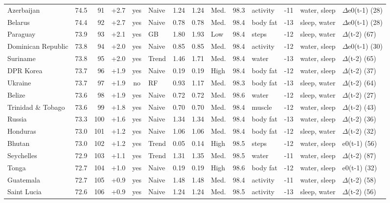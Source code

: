 {\begin{longtable}{l r r r c l r r l r l r l l}
Azerbaijan & 74.5 & 91 & +2.7 & yes & Naive & 1.24 & 1.24 & Med. & 98.3 & activity & -11 & water, sleep & $\Delta$e0(t-1) (28) \\
Belarus & 74.4 & 92 & +2.7 & yes & Naive & 0.78 & 0.78 & Med. & 98.4 & body fat & -13 & sleep, water & $\Delta$e0(t-1) (28) \\
Paraguay & 73.9 & 93 & +2.1 & yes & GB & 1.80 & 1.93 & Low & 98.4 & steps & -12 & sleep, water & $\Delta$(t-2) (67) \\
Dominican Republic & 73.8 & 94 & +2.0 & yes & Naive & 0.85 & 0.85 & Med. & 98.4 & activity & -12 & water, sleep & $\Delta$e0(t-1) (30) \\
Suriname & 73.8 & 95 & +2.0 & yes & Trend & 1.46 & 1.71 & Med. & 98.4 & water & -13 & water, sleep & $\Delta$(t-2) (65) \\
DPR Korea & 73.7 & 96 & +1.9 & yes & Naive & 0.19 & 0.19 & High & 98.4 & body fat & -12 & water, sleep & $\Delta$(t-2) (37) \\
Ukraine & 73.7 & 97 & +1.9 & no & RF & 0.93 & 1.17 & Med. & 98.3 & body fat & -13 & sleep, water & $\Delta$(t-2) (64) \\
Belize & 73.6 & 98 & +1.9 & yes & Naive & 0.72 & 0.72 & Med. & 98.6 & water & -12 & sleep, water & $\Delta$(t-2) (27) \\
Trinidad \& Tobago & 73.6 & 99 & +1.8 & yes & Naive & 0.70 & 0.70 & Med. & 98.4 & muscle & -12 & water, sleep & $\Delta$(t-2) (43) \\
Russia & 73.3 & 100 & +1.6 & yes & Naive & 1.34 & 1.34 & Med. & 98.4 & body fat & -13 & water, sleep & $\Delta$(t-2) (36) \\
Honduras & 73.0 & 101 & +1.2 & yes & Naive & 1.06 & 1.06 & Med. & 98.4 & body fat & -12 & sleep, water & $\Delta$(t-2) (32) \\
Bhutan & 73.0 & 102 & +1.2 & yes & Trend & 0.05 & 0.14 & High & 98.5 & steps & -12 & water, sleep & e0(t-1) (56) \\
Seychelles & 72.9 & 103 & +1.1 & yes & Trend & 1.31 & 1.35 & Med. & 98.5 & water & -11 & water, sleep & $\Delta$(t-2) (87) \\
Tonga & 72.7 & 104 & +1.0 & yes & Naive & 0.19 & 0.19 & High & 98.6 & body fat & -12 & water, sleep & e0(t-1) (32) \\
Guatemala & 72.7 & 105 & +0.9 & yes & Naive & 1.48 & 1.48 & Med. & 98.4 & activity & -11 & water, sleep & $\Delta$(t-2) (58) \\
Saint Lucia & 72.6 & 106 & +0.9 & yes & Naive & 1.24 & 1.24 & Med. & 98.5 & activity & -13 & sleep, water & $\Delta$(t-2) (56) \\

\end{longtable}}
